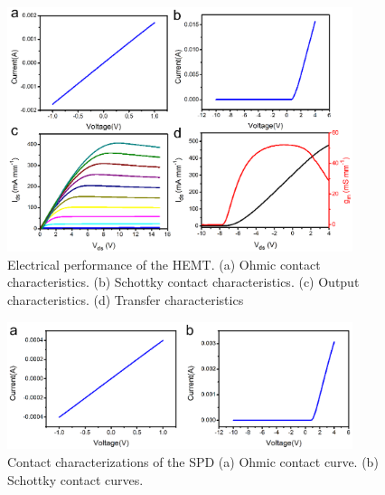 \begin{figure}[H] 
\centering    
\includegraphics[width=0.9\textwidth]{ch3_hemt}
\caption[Electrical performance of the HEMT]{Electrical performance of the HEMT. (a) Ohmic contact characteristics. (b) Schottky contact characteristics. (c) Output characteristics. (d) Transfer characteristics}
\label{fig3:hemt}
\end{figure}


\begin{figure}[H] 
\centering    
\includegraphics[width=0.9\textwidth]{ch3_spdcontact}
\caption[Contact characterizations of the SPD]{Contact characterizations of the SPD (a) Ohmic contact curve. (b) Schottky contact curves.}
\label{fig3:spdcontact}
\end{figure}


